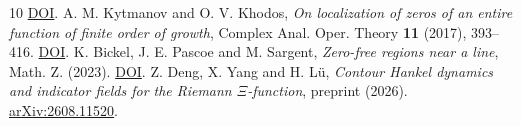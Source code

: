 \documentclass[11pt,letterpaper]{article}
\begin{document}
\begin{thebibliography}{10}
\href{https://doi.org/10.1090/bull/1723}{DOI}.
 A. M. Kytmanov and O. V. Khodos, \emph{On localization of zeros of an entire function of finite order of growth}, Complex Anal. Oper. Theory \textbf{11} (2017), 393--416.
\href{https://doi.org/10.1007/s11785-016-0606-8}{DOI}.
 K. Bickel, J. E. Pascoe and M. Sargent, \emph{Zero-free regions near a line}, Math. Z. (2023).
\href{https://doi.org/10.1007/s00209-023-03364-w}{DOI}.
 Z. Deng, X. Yang and H. L\"u, \emph{Contour Hankel dynamics and indicator fields for the Riemann \(\Xi\)-function}, preprint (2026).
\href{https://arxiv.org/abs/2608.11520}{arXiv:2608.11520}.
\end{thebibliography}
\endgroup
\end{document}
